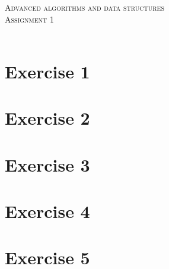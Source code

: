 \documentclass{article}
\begin{document}
\begin{center}
\textsc{\Large Advanced algorithms and data structures}\\[0.5cm]
\textsc{\large Assignment 1}\\[0.5cm]
\textsc{\large }\\[0.5cm]
\vspace{1 cm}
\end{center}

\section*{Exercise 1}


\section*{Exercise 2}

\section*{Exercise 3}


\section*{Exercise 4}



\section*{Exercise 5}
\end{document}
